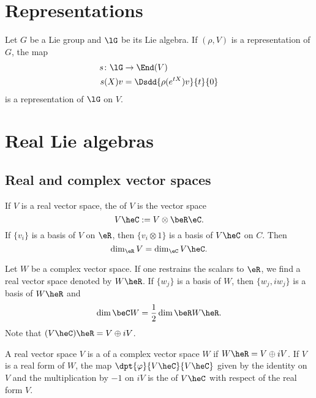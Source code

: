\section{Representations}

\begin{theorem}       \label{THOooLVSNooOpzYgO}
    Let \( G\) be a Lie group and \( \lG\) be its Lie algebra. If \( (\rho, V)\) is a representation of \( G\), the map
    \begin{equation}
        \begin{aligned}
            s\colon \lG&\to \End(V) \\
            s(X)v&=\Dsdd{ \rho( e^{tX})v }{t}{0} 
        \end{aligned}
    \end{equation}
    is a representation of \( \lG\) on \( V\).
\end{theorem}


\section{Real Lie algebras}

\subsection{Real and complex vector spaces}

If $V$ is a real vector space, the  of $V$ is the vector space
\[
  V\heC:=V\otimes\beR\eC.
\]
If $\{v_i\}$ is a basis of $V$ on $\eR$, then $\{v_i\otimes 1\}$ is a basis of $V\heC$ on $C$. Then
\[
   \dim_{\eR}V=\dim_{\eC}V\heC.
\]

Let $W$ be a complex vector space. If one restrains the scalars to $\eR$, we find a real vector space denoted by $W\heR$. If $\{w_j\}$ is a basis of $W$, then $\{w_j,iw_j\}$ is a basis of $W\heR$ and
\[
  \dim\beC W=\frac{1}{2}\dim\beR W\heR.
\]
Note that $(V\heC)\heR=V\oplus iV$.

A real vector space $V$ is a  of a complex vector space $W$ if $W\heR=V\oplus iV$. If $V$ is a real form of $W$, the map $\dpt{\varphi}{V\heC}{V\heC}$ given by the identity on $V$ and the multiplication by $-1$ on $iV$ is the  of $V\heC$ with respect of the real form $V$.

